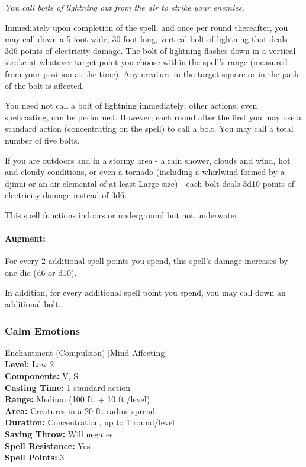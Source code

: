 \emph{You call bolts of lightning out from the air to strike your enemies.}

Immediately upon completion of the spell, and once per round thereafter, you may call down a 5-foot-wide, 30-foot-long, vertical bolt of lightning that deals 3d6 points of electricity damage. 
The bolt of lightning flashes down in a vertical stroke at whatever target point you choose within the spell's range (measured from your position at the time). 
Any creature in the target square or in the path of the bolt is affected.

You need not call a bolt of lightning immediately; other actions, even spellcasting, can be performed. 
However, each round after the first you may use a standard action (concentrating on the spell) to call a bolt. You may call a total number of five bolts.

If you are outdoors and in a stormy area - a rain shower, clouds and wind, hot and cloudy conditions, or even a tornado (including a whirlwind formed by a djinni or an air elemental of at least Large size) - each bolt deals 3d10 points of electricity damage instead of 3d6.

This spell functions indoors or underground but not underwater.

\paragraph{Augment:} For every 2 additional spell points you spend, this spell's damage increases by one die (d6 or d10).

In addition, for every additional spell point you spend, you may call down an additional bolt.
\subsubsection{Calm Emotions}
\label{Spell:CalmEmotions}
Enchantment (Compulsion) [Mind-Affecting]
\\ \textbf{Level:} Law 2
\\ \textbf{Components:} V, S
\\ \textbf{Casting Time:} 1 standard action
\\ \textbf{Range:} Medium (100 ft. + 10 ft./level)
\\ \textbf{Area:} Creatures in a 20-ft.-radius spread
\\ \textbf{Duration:} Concentration, up to 1 round/level
\\ \textbf{Saving Throw:} Will negates
\\ \textbf{Spell Resistance:} Yes
\\ \textbf{Spell Points:} 3

